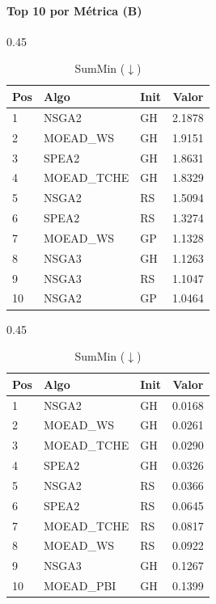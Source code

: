 \documentclass[a4paper,10pt]{article} %
\begin{document}
\paragraph{Top 10 por Métrica (B)}

\begin{table}[H]
    \centering
    \begin{subtable}[t]{0.45\textwidth}
        \centering
        \caption{Range ($\uparrow$)}
        \begin{tabular}{lllc}
            \toprule
            Pos & Algo & Init & Valor \\
            \midrule
            1 & NSGA2 & GH & 2.1878 \\
            2 & MOEAD\_WS & GH & 1.9151 \\
            3 & SPEA2 & GH & 1.8631 \\
            4 & MOEAD\_TCHE & GH & 1.8329 \\
            5 & NSGA2 & RS & 1.5094 \\
            6 & SPEA2 & RS & 1.3274 \\
            7 & MOEAD\_WS & GP & 1.1328 \\
            8 & NSGA3 & GH & 1.1263 \\
            9 & NSGA3 & RS & 1.1047 \\
            10 & NSGA2 & GP & 1.0464 \\
            \bottomrule
        \end{tabular}
    \end{subtable}
    \hfill
    \begin{subtable}[t]{0.45\textwidth}
        \centering
        \caption{SumMin ($\downarrow$)}
        \begin{tabular}{lllc}
            \toprule
            Pos & Algo & Init & Valor \\
            \midrule
            1 & NSGA2 & GH & 0.0168 \\
            2 & MOEAD\_WS & GH & 0.0261 \\
            3 & MOEAD\_TCHE & GH & 0.0290 \\
            4 & SPEA2 & GH & 0.0326 \\
            5 & NSGA2 & RS & 0.0366 \\
            6 & SPEA2 & RS & 0.0645 \\
            7 & MOEAD\_TCHE & RS & 0.0817 \\
            8 & MOEAD\_WS & RS & 0.0922 \\
            9 & NSGA3 & GH & 0.1267 \\
            10 & MOEAD\_PBI & GH & 0.1399 \\
            \bottomrule
        \end{tabular}
    \end{subtable}
\end{table}
\end{document}

